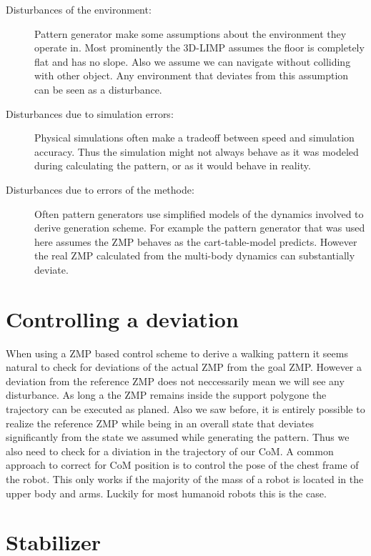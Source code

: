 \documentclass[english,ngerman]{KITreprt}
\begin{document}
\begin{description}
\item[Disturbances of the environment:]
Pattern generator make some assumptions about the environment they
operate in. Most prominently the 3D-LIMP assumes the floor is completely
flat and has no slope. Also we assume we can navigate without colliding
with other object. Any environment that deviates from this assumption
can be seen as a disturbance.
\item[Disturbances due to simulation errors:]
Physical simulations often make a tradeoff between speed and simulation
accuracy. Thus the simulation might not always behave as it was modeled
during calculating the pattern, or as it would behave in reality.
\item[Disturbances due to errors of the methode:]
Often pattern generators use simplified models of the dynamics involved
to derive generation scheme. For example the pattern generator that was
used here assumes the ZMP behaves as the cart-table-model predicts.
However the real ZMP calculated from the multi-body dynamics can
substantially deviate.
\end{description}

\section{Controlling a deviation}\label{controlling-a-deviation}

When using a ZMP based control scheme to derive a walking pattern it
seems natural to check for deviations of the actual ZMP from the goal
ZMP. However a deviation from the reference ZMP does not neccessarily
mean we will see any disturbance. As long a the ZMP remains inside the
support polygone the trajectory can be executed as planed. Also we saw
before, it is entirely possible to realize the reference ZMP while being
in an overall state that deviates significantly from the state we
assumed while generating the pattern. Thus we also need to check for a
diviation in the trajectory of our CoM. A common approach to correct for
CoM position is to control the pose of the chest frame of the robot.
This only works if the majority of the mass of a robot is located in the
upper body and arms. Luckily for most humanoid robots this is the case.

\section{Stabilizer}\label{stabilizer}
\end{document}
